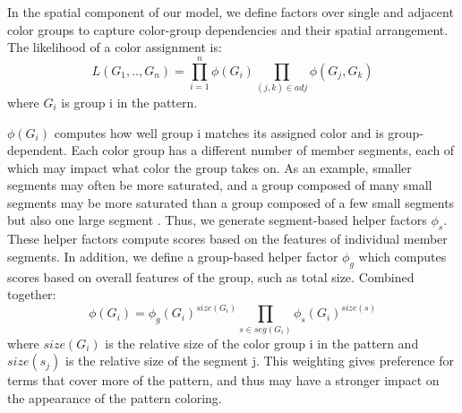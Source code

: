


In the spatial component of our model, we define factors over single and adjacent color groups to capture color-group dependencies and their spatial arrangement. The likelihood of a color assignment is:
\begin{equation}
L(G_1,..,G_n) = \prod_{i=1}^n \phi(G_i) \prod_{(j,k) \in adj} \phi(G_j, G_k)
\end{equation}
where $G_i$ is group i in the pattern.

$\phi(G_i)$ computes how well group i matches its assigned color and is group-dependent. Each color group has a different number of member segments, each of which may impact what color the group takes on. As an example, smaller segments may often be more saturated, and a group composed of many small segments may be more saturated than a group composed of a few small segments but also one large segment . Thus, we generate segment-based helper factors $\phi_s$. These helper factors compute scores based on the features of individual member segments. In addition, we define a group-based helper factor $\phi_g$ which computes scores based on overall features of the group, such as total size. Combined together:
\begin{equation}
\phi(G_i) = \phi_g(G_i)^{size(G_i)} \prod_{s \in seg(G_i)} \phi_{s}(G_i)^{size(s)}
\end{equation}
where $size(G_i)$ is the relative size of the color group i in the pattern and $size({s_j})$ is the relative size of the segment j. This weighting gives preference for terms that cover more of the pattern, and thus may have a stronger impact on the appearance of the pattern coloring.

